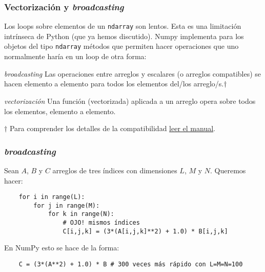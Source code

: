 \documentclass{beamer}
\begin{document}
\begin{frame}[fragile]
    \frametitle{Vectorización y {\em broadcasting}}
    \alert{Los loops sobre elementos de un {\tt ndarray} son lentos.} Esta es una limitación intrínseca de Python 
    (que ya hemos discutido). Numpy implementa para los objetos del tipo {\tt ndarray} métodos que permiten hacer
    operaciones que uno normalmente haría en un loop de otra forma:
    \begin{block}{{\em broadcasting}}
        Las operaciones entre arreglos y escalares (o arreglos compatibles) se hacen elemento a elemento
        para todos los elementos del/los arreglo/s.$\dagger$
    \end{block}
    \begin{block}{{\em vectorización}}
        Una función (vectorizada) aplicada a un arreglo opera sobre todos los elementos, elemento a elemento.
    \end{block}
    $\dagger$ Para comprender los detalles de la compatibilidad
    \href{https://numpy.org/doc/stable/user/basics.broadcasting.html}{leer el manual}.
    \end{frame}

\begin{frame}[fragile]
    \frametitle{{\em broadcasting}}
    Sean $A$, $B$ y $C$ arreglos de tres índices con dimensiones $L$, $M$ y $N$. Queremos hacer:
    \vspace{0.3cm}
    \begin{verbatim}
    for i in range(L):
        for j in range(M):
            for k in range(N):
                # OJO! mismos índices
                C[i,j,k] = (3*(A[i,j,k]**2) + 1.0) * B[i,j,k] 
    \end{verbatim}
    \vspace{0.3cm}
    En NumPy esto se hace de la forma:
    \vspace{0.3cm}
    \begin{verbatim}
    C = (3*(A**2) + 1.0) * B # 300 veces más rápido con L=M=N=100
    \end{verbatim}
    \end{frame}
\end{document}
